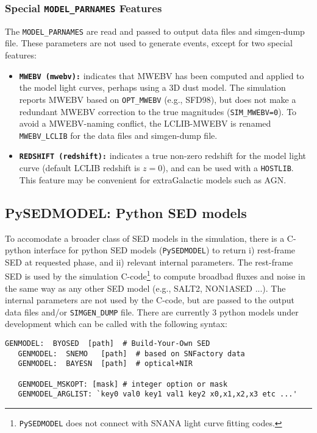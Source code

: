 \documentclass[12pt]{article}
\begin{document}
\clearpage
\subsubsection{Special {\tt MODEL\_PARNAMES} Features}
\label{sss:LCLIB_parnames}

The {\tt MODEL\_PARNAMES} are read and passed to output data files 
and simgen-dump file. These parameters are not used to generate events,
except for two special features:

\begin{itemize}
  \item {\tt\bf MWEBV (mwebv):} indicates that MWEBV has been computed
     and applied to the model light curves, perhaps using a 3D dust model.
     The simulation reports MWEBV based on {\tt OPT\_MWEBV} (e.g., SFD98),
     but does not make a redundant MWEBV correction to the true
     magnitudes ({\tt SIM\_MWEBV=0}). To avoid a MWEBV-naming conflict,
     the LCLIB-MWEBV is renamed {\tt MWEBV\_LCLIB} for the data files
     and simgen-dump file.
  \item {\tt\bf REDSHIFT (redshift):}
     indicates a true non-zero redshift for the model light curve
     (default LCLIB redshift is $z=0$), 
     and can be used with a {\tt HOSTLIB}. 
     This feature may be convenient for extraGalactic models such as AGN.
\end{itemize}


\clearpage
\subsection{PySEDMODEL: Python SED models}
\label{subsec:PySEDMODEL}

To accomodate a broader class of SED models in the simulation,
there is a C-python interface for python SED models ({\tt PySEDMODEL}) 
to return
i) rest-frame SED at requested phase, and 
ii) relevant internal parameters.
The rest-frame SED is used by the simulation C-code\footnote{{\tt PySEDMODEL}
  does not connect with SNANA light curve fitting codes.}
to compute broadbad fluxes and noise in the same way as
any other SED model (e.g., SALT2, NON1ASED ...). 
The internal parameters are not used by the C-code, 
but are passed to the output data files and/or {\tt SIMGEN\_DUMP} file.
There are currently 3 python models under development which
can be called with the following syntax:
%
\begin{Verbatim}[frame=single]
   GENMODEL:  BYOSED  [path]  # Build-Your-Own SED
   GENMODEL:  SNEMO   [path]  # based on SNFactory data
   GENMODEL:  BAYESN  [path]  # optical+NIR

   GENMODEL_MSKOPT: [mask] # integer option or mask
   GENMODEL_ARGLIST: `key0 val0 key1 val1 key2 x0,x1,x2,x3 etc ...'
\end{Verbatim}
\end{document}
